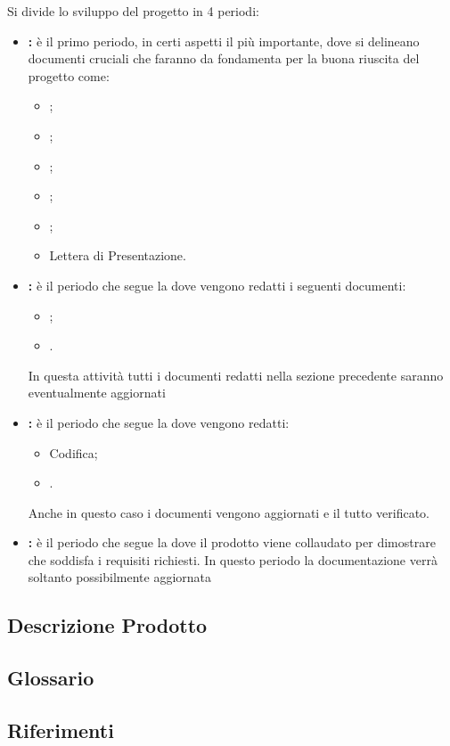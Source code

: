 \documentclass[12pt,a4paper]{article}
\begin{document}
Si divide lo sviluppo del progetto in 4 periodi:
\begin{itemize}
	\item \textbf{\FA{}:} è il primo periodo, in certi aspetti il più importante, dove si delineano documenti cruciali che faranno da fondamenta per la buona riuscita del progetto come:
	\begin{itemize}
		\item \NdP{};
		\item \SdF{};
		\item \AdR{};
		\item \PdP{};
		\item \PdQ{};
		\item Lettera di Presentazione.
	\end{itemize}
	\item \textbf{\FPA{}:} è il periodo che segue la \RR{} dove vengono redatti i seguenti documenti:
	\begin{itemize}
		\item \ST{};
        \item \DP{}.
	\end{itemize} 
	In questa attività tutti i documenti redatti nella sezione precedente saranno eventualmente aggiornati
	\item \textbf{\FPDC{}:} è il periodo che segue la \RP{} dove vengono redatti:
	\begin{itemize}
		\item Codifica;
		\item \MU{}.
	\end{itemize}
	Anche in questo caso i documenti vengono aggiornati e il tutto verificato.
	\item \textbf{\FVV{}:} è il periodo che segue la \RQ{} dove il prodotto viene collaudato per dimostrare che soddisfa i requisiti richiesti. In questo periodo la documentazione verrà soltanto possibilmente aggiornata
\end{itemize}

\subsection{Descrizione Prodotto}
\descrizioneProdotto

\subsection{Glossario}\label{glossario}
\glossarioPrint

\subsection{Riferimenti}\label{riferimenti}
\end{document}
